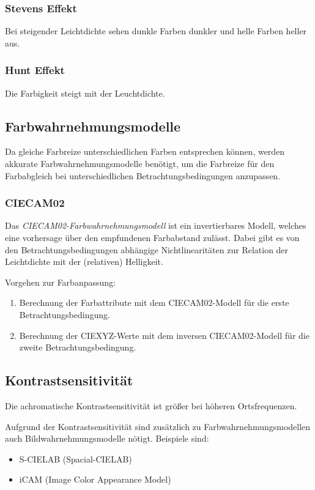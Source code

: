 			\subsubsection{Stevens Effekt}
				Bei steigender Leichtdichte sehen dunkle Farben dunkler und helle Farben heller aus.

			\subsubsection{Hunt Effekt}
				Die Farbigkeit steigt mit der Leuchtdichte.

		\subsection{Farbwahrnehmungsmodelle}
			Da gleiche Farbreize unterschiedlichen Farben entsprechen können, werden akkurate Farbwahrnehmungsmodelle benötigt, um die Farbreize für den Farbabgleich bei unterschiedlichen Betrachtungsbedingungen anzupassen.

			\subsubsection{CIECAM02}
				Das \emph{CIECAM02-Farbwahrnehmungsmodell} ist ein invertierbares Modell, welches eine vorhersage über den empfundenen Farbabstand zulässt. Dabei gibt es von den Betrachtungsbedingungen abhängige Nichtlinearitäten zur Relation der Leichtdichte mit der (relativen) Helligkeit.
				
				Vorgehen zur Farbanpassung:
				\begin{enumerate}
					\item Berechnung der Farbattribute mit dem CIECAM02-Modell für die erste Betrachtungsbedingung.
					\item Berechnung der CIEXYZ-Werte mit dem inversen CIECAM02-Modell für die zweite Betrachtungsbedingung.
				\end{enumerate}

		\subsection{Kontrastsensitivität}
			Die achromatische Kontrastsensitivität ist größer bei höheren Ortsfrequenzen.
			
			Aufgrund der Kontrastsensitivität sind zusätzlich zu Farbwahrnehmungsmodellen auch Bildwahrnehmungsmodelle nötigt. Beispiele sind:
			\begin{itemize}
				\item S-CIELAB (Spacial-CIELAB)
				\item iCAM (Image Color Appearance Model)
			\end{itemize}

